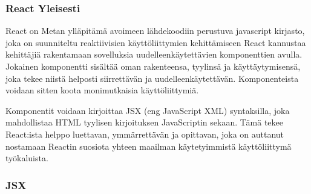 

\subsubsection{React Yleisesti}















React on Metan ylläpitämä avoimeen lähdekoodiin perustuva javascript kirjasto,
joka on suunniteltu reaktiivisien käyttöliittymien kehittämiseen
React kannustaa kehittäjiä rakentamaan sovelluksia uudelleenkäytettävien komponenttien avulla.
Jokainen komponentti sisältää oman rakenteensa, tyylinsä ja käyttäytymisensä, joka tekee niistä helposti siirrettävän ja uudelleenkäytettävän.
Komponenteista voidaan sitten koota monimutkaisia käyttöliittymiä. 
\medskip


Komponentit voidaan kirjoittaa JSX (eng JavaScript XML) syntaksilla, joka mahdollistaa HTML tyylisen kirjoituksen JavaScriptin sekaan.
Tämä tekee React:ista helppo luettavan, ymmärrettävän ja opittavan,
joka on auttanut nostamaan Reactin suosiota yhteen maailman käytetyimmistä käyttöliittymä työkaluista.
\medskip









\subsubsection{JSX}






